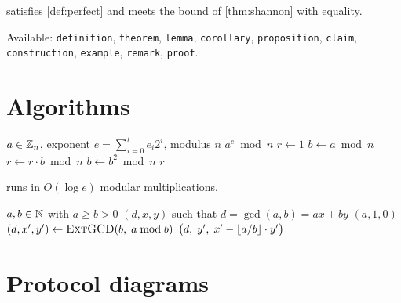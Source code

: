\documentclass[11pt,a4paper]{article}
\begin{document}
\begin{lemma}\label{lem:otp}
     satisfies \cref{def:perfect} and meets the bound of
    \cref{thm:shannon} with equality.
\end{lemma}

\begin{remark}
    Available: \texttt{definition}, \texttt{theorem}, \texttt{lemma},
    \texttt{corollary}, \texttt{proposition}, \texttt{claim},
    \texttt{construction}, \texttt{example}, \texttt{remark}, \texttt{proof}.
\end{remark}

\section{Algorithms}

\begin{algorithm}[H]
\caption{Square-and-multiply modular exponentiation.}
\label{alg:modexp}
\begin{algorithmic}[1]
    \Require $a \in \mathbb{Z}_{n}$, exponent $e = \sum_{i=0}^{t} e_i 2^i$, modulus $n$
    \Ensure $a^{e} \bmod n$
    \State $r \gets 1$
    \State $b \gets a \bmod n$
            \State $r \gets r \cdot b \bmod n$
        \EndIf
        \State $b \gets b^{2} \bmod n$
    \EndFor
    \State \Return $r$
\end{algorithmic}
\end{algorithm}

 runs in $O(\log e)$ modular multiplications.

\begin{algorithm}[H]
\caption{Extended Euclidean algorithm.}
\label{alg:egcd}
\begin{algorithmic}[1]
    \Require $a, b \in \mathbb{N}$ with $a \geq b > 0$
    \Ensure $(d, x, y)$ such that $d = \gcd(a,b) = ax + by$
            \State \Return $(a, 1, 0)$
        \EndIf
        \State $(d, x', y') \gets \Call{ExtGCD}{b,\; a \bmod b}$
        \State \Return $\bigl(d,\; y',\; x' - \left\lfloor a/b \right\rfloor \cdot y'\bigr)$
    \EndFunction
\end{algorithmic}
\end{algorithm}

\section{Protocol diagrams}
\end{document}
